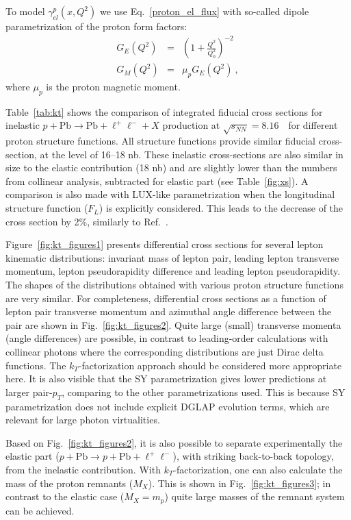To model $\gamma^{p}_{el}(x, Q^2)$ we use Eq.~\ref{proton_el_flux} with so-called dipole parametrization of the proton form factors:
\begin{eqnarray}
G_E(Q^2) &=& \left( 1+\frac{Q^2}{Q_0^2} \right)^{-2} \\
G_M(Q^2) &=& \mu_p G_E(Q^2)~,
\end{eqnarray}
where $\mu_p$ is the proton magnetic moment.

Table~\ref{tab:kt} shows the comparison of integrated fiducial cross sections for inelastic $p+\textrm{Pb}\rightarrow \textrm{Pb} + \ell^+\ell^- + X$ production at $\sqrt{s_{N N}} = 8.16$~\TeV\ for different proton structure functions.
All structure functions provide similar fiducial cross-section, at the level of 16--18 nb.
These inelastic cross-sections are also similar in size to the elastic contribution (18 nb) and are slightly lower than the numbers from collinear analysis, subtracted for elastic part (see Table~\ref{fig:xs}).
A comparison is also made with LUX-like parametrization when the longitudinal structure function ($F_L$) is explicitly considered.
This leads to the decrease of the cross section by 2\%, similarly to Ref.~\cite{Luszczak:2018ntp}.

Figure~\ref{fig:kt_figures1} presents differential cross sections for several lepton kinematic distributions: invariant mass of lepton pair, leading lepton transverse momentum, lepton pseudorapidity difference and leading lepton pseudorapidity.
The shapes of the distributions obtained with various proton structure functions are very similar.
For completeness, differential cross sections as a function of lepton pair transverse momentum and azimuthal angle difference between the pair  are shown in Fig.~\ref{fig:kt_figures2}. Quite large (small) transverse momenta (angle differences) are possible, in contrast to leading-order calculations with collinear photons where the corresponding distributions are just Dirac delta functions. 
The $k_T$-factorization approach should be considered more appropriate here. It is also visible that the SY parametrization gives lower predictions at larger pair-$p_T$, comparing to the other parametrizations used. This is because SY parametrization does not include explicit DGLAP evolution terms, which are relevant for large photon virtualities.

Based on Fig.~\ref{fig:kt_figures2}, it is also possible to separate experimentally the elastic part ($p+\textrm{Pb}\rightarrow p+ \textrm{Pb} + \ell^+\ell^-$), with striking back-to-back topology, from the inelastic contribution.
With $k_T$-factorization, one can also calculate the mass of the proton remnants ($M_X$). This is shown in Fig.~\ref{fig:kt_figures3}; in contrast to the elastic case ($M_X=m_p$) quite large masses of the remnant system can be achieved.



